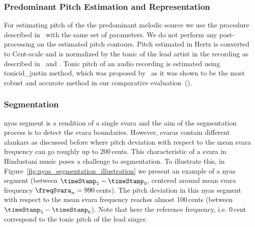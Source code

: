 {\subsubsection{Predominant Pitch Estimation and Representation}

For estimating pitch of the the predominant melodic source we use the procedure described in~ with the same set of parameters. We do not perform any post-processing on the estimated pitch contours. Pitch estimated in Hertz is converted to Cent-scale and is normalized by the tonic of the lead artist in the recording as described in~ and . Tonic pitch of an audio recording is estimated using \acrshort{tonicid_justin} method, which was proposed by~\cite{salamon2012multipitch} as it was shown to be the most robust and accurate method in our comparative evaluation~(). 


\subsubsection{Segmentation}
\label{sec:nyas_svara_segmentation_method}

\Gls{nyas} segment is a rendition of a single \gls{svara} and the aim of the segmentation process is to detect the \gls{svara} boundaries. However, \glspl{svara} contain different \glspl{alankar} as discussed before where pitch deviation with respect to the mean \gls{svara} frequency can go roughly up to 200\,cents. This characteristic of a \gls{svara} in Hindustani music poses a challenge to segmentation. To illustrate this, in Figure~\ref{fig:nyas_segmentation_illustration} we present an example of a \gls{nyas} segment (between $\timeStamp_1-\timeStamp_9$, centered around mean \gls{svara} frequency $\freqSvara_n=990$\,cents). The pitch deviation in this \gls{nyas} segment with respect to the mean \gls{svara} frequency reaches almost 100\,cents (between $\timeStamp_5-\timeStamp_6$). Note that here the reference frequency, i.e. 0\,cent correspond to the tonic pitch of the lead singer.

}
